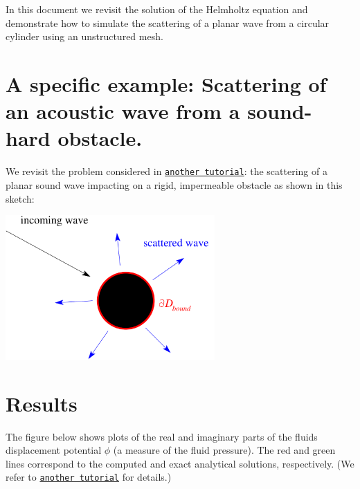 In this document we revisit the solution of the Helmholtz equation and demonstrate how to simulate the scattering of a planar wave from a circular cylinder using an unstructured mesh.



 

\hypertarget{index_scattering}{}\section{A specific example\+: Scattering of an acoustic wave from a sound-\/hard obstacle.}\label{index_scattering}
We revisit the problem considered in \href{../../scattering/html/index.html}{\tt another tutorial}\+: the scattering of a planar sound wave impacting on a rigid, impermeable obstacle as shown in this sketch\+:

 
\begin{DoxyImage}
\includegraphics[width=0.6\textwidth]{scattering}
\end{DoxyImage}




 

\hypertarget{index_results}{}\section{Results}\label{index_results}
The figure below shows plots of the real and imaginary parts of the fluid\textquotesingle{}s displacement potential $ \phi $ (a measure of the fluid pressure). The red and green lines correspond to the computed and exact analytical solutions, respectively. (We refer to \href{../../scattering/html/index.html}{\tt another tutorial} for details.)

